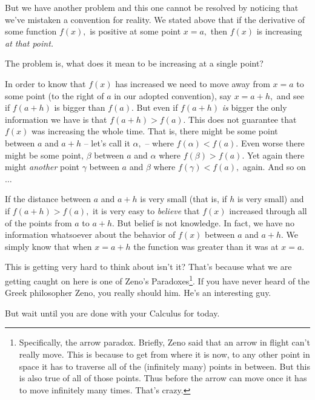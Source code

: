 But we have another problem and this one cannot be resolved by
noticing that we've mistaken a convention for reality. We stated above
that if the derivative of some function $f(x),$ is positive at some
point $x=a,$ then $f(x)$ is increasing \emph{at that point.}

The problem is, what does it mean to be increasing at a single point?

In order to know that $f(x)$ has increased we need to move away from
$x=a$ to some point (to the right of $a$ in our adopted convention),
say $x=a+h,$ and see if $f(a+h)$ is bigger than $f(a).$ But even if
$f(a+h)$ \emph{is} bigger the only information we have is that
$f(a+h)>f(a).$ This does not guarantee that $f(x)$ was increasing the
whole time. That is, there might be some point between $a$ and $a+h$
-- let's call it $\alpha,$ -- where $f(\alpha)<f(a).$ Even worse there
might be some point, $\beta$ between $a$ and $\alpha$ where
$f(\beta)>f(a).$ Yet again there might \emph{another} point $\gamma$
between $a$ and $\beta$ where $f(\gamma) < f(a),$ again. And so on
$\ldots$

If the distance between $a$ and $a+h$ is very small (that is, if $h$
is very small) and if $f(a+h)>f(a),$  it is very easy to
\emph{believe} that $f(x)$ increased through all of the points from
$a$ to $a+h.$ But belief is not knowledge. In fact, we have no
information whatsoever about the behavior of $f(x)$ between $a$ and
$a+h.$ We simply know that when $x=a+h$ the function was greater than
it was at $x=a.$

This is getting very hard to think about isn't it? That's because what
we are getting caught on here is one of Zeno's
Paradoxes\footnote{Specifically, the arrow paradox. Briefly, Zeno said
  that an arrow in flight can't really move. This is because to get
  from where it is now, to any other point in space it has to traverse
  all of the (infinitely many) points in between. But this is also
  true of all of those points. Thus before the arrow can move once it
  has to move infinitely many times. That's crazy.}. If you have never
heard of the Greek philosopher Zeno, you really should \google{}
him. He's an interesting guy. 

But wait until you are done with your Calculus for today.

